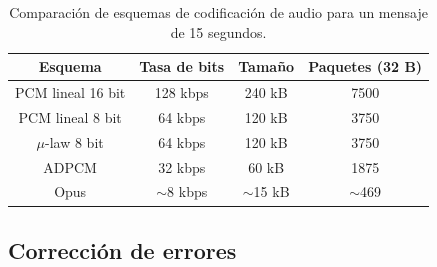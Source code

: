 \begin{table}[htb]
    \centering
    \caption{Comparación de esquemas de codificación de audio para un mensaje de 15 segundos.}
    \label{tab:esquemas}
    \begin{tabular}{@{}cccc@{}}
        \toprule
        Esquema & Tasa de bits & Tamaño & Paquetes (32 B) \\
        \midrule
        PCM lineal 16 bit   & 128 kbps     & 240 kB      & 7500 \\
        PCM lineal 8 bit    & 64 kbps      & 120 kB      & 3750 \\
        $\mu$-law 8 bit     & 64 kbps      & 120 kB      & 3750 \\
        ADPCM               & 32 kbps      & 60 kB       & 1875 \\
        Opus                & $\sim$8 kbps & $\sim$15 kB & $\sim$469  \\
        \bottomrule
    \end{tabular}
\end{table}

\subsection{Corrección de errores}

